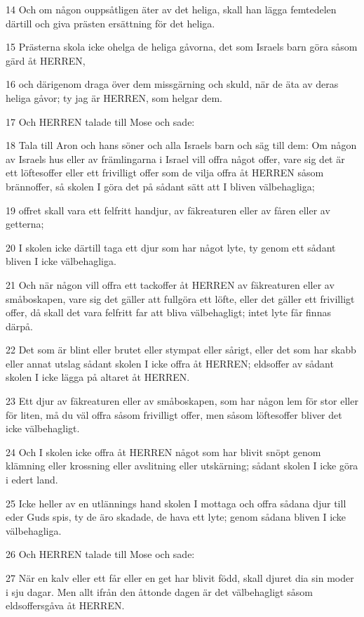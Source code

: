 \par 14 Och om någon ouppsåtligen äter av det heliga, skall han lägga femtedelen därtill och giva prästen ersättning för det heliga.
\par 15 Prästerna skola icke ohelga de heliga gåvorna, det som Israels barn göra såsom gärd åt HERREN,
\par 16 och därigenom draga över dem missgärning och skuld, när de äta av deras heliga gåvor; ty jag är HERREN, som helgar dem.
\par 17 Och HERREN talade till Mose och sade:
\par 18 Tala till Aron och hans söner och alla Israels barn och säg till dem: Om någon av Israels hus eller av främlingarna i Israel vill offra något offer, vare sig det är ett löftesoffer eller ett frivilligt offer som de vilja offra åt HERREN såsom brännoffer, så skolen I göra det på sådant sätt att I bliven välbehagliga;
\par 19 offret skall vara ett felfritt handjur, av fäkreaturen eller av fåren eller av getterna;
\par 20 I skolen icke därtill taga ett djur som har något lyte, ty genom ett sådant bliven I icke välbehagliga.
\par 21 Och när någon vill offra ett tackoffer åt HERREN av fäkreaturen eller av småboskapen, vare sig det gäller att fullgöra ett löfte, eller det gäller ett frivilligt offer, då skall det vara felfritt far att bliva välbehagligt; intet lyte får finnas därpå.
\par 22 Det som är blint eller brutet eller stympat eller sårigt, eller det som har skabb eller annat utslag sådant skolen I icke offra åt HERREN; eldsoffer av sådant skolen I icke lägga på altaret åt HERREN.
\par 23 Ett djur av fäkreaturen eller av småboskapen, som har någon lem för stor eller för liten, må du väl offra såsom frivilligt offer, men såsom löftesoffer bliver det icke välbehagligt.
\par 24 Och I skolen icke offra åt HERREN något som har blivit snöpt genom klämning eller krossning eller avslitning eller utskärning; sådant skolen I icke göra i edert land.
\par 25 Icke heller av en utlännings hand skolen I mottaga och offra sådana djur till eder Guds spis, ty de äro skadade, de hava ett lyte; genom sådana bliven I icke välbehagliga.
\par 26 Och HERREN talade till Mose och sade:
\par 27 När en kalv eller ett får eller en get har blivit född, skall djuret dia sin moder i sju dagar. Men allt ifrån den åttonde dagen är det välbehagligt såsom eldsoffersgåva åt HERREN.
